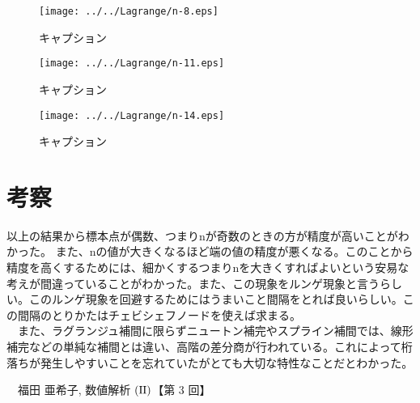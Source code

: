 \documentclass[titlepage, a4paper, 11pt, dvipdfmx]{jsarticle}
\begin{document}
\begin{figure}[H]
  \begin{center}%
    \texttt{[image: ../../Lagrange/n-8.eps]}%
  \caption{キャプション}
  \label{Label}%
  \end{center}
\end{figure}

\begin{figure}[H]
  \begin{center}%
    \texttt{[image: ../../Lagrange/n-11.eps]}%
  \caption{キャプション}
  \label{Label}%
  \end{center}
\end{figure}

\begin{figure}[H]
  \begin{center}%
    \texttt{[image: ../../Lagrange/n-14.eps]}%
  \caption{キャプション}
  \label{Label}%
  \end{center}
\end{figure}

\section{考察}
以上の結果から標本点が偶数、つまりnが奇数のときの方が精度が高いことがわかった。
また、nの値が大きくなるほど端の値の精度が悪くなる。このことから精度を高くするためには、細かくするつまりnを大きくすればよいという安易な考えが間違っていることがわかった。また、この現象をルンゲ現象と言うらしい。このルンゲ現象を回避するためにはうまいこと間隔をとれば良いらしい。この間隔のとりかたはチェビシェフノードを使えば求まる。\\
　また、ラグランジュ補間に限らずニュートン補完やスプライン補間では、線形補完などの単純な補間とは違い、高階の差分商が行われている。これによって桁落ちが発生しやすいことを忘れていたがとても大切な特性なことだとわかった。
\begin{thebibliography}{1}
　福田 亜希子, 数値解析 $\rm(I\hspace{-.01em}I)$【第 3 回】 
\end{thebibliography}
\end{document}
